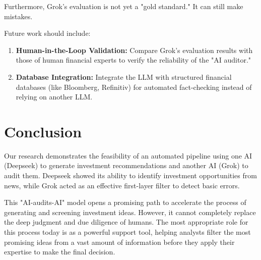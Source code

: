 \documentclass{article}
\begin{document}
Furthermore, Grok's evaluation is not yet a "gold standard." It can still make mistakes.

Future work should include:
\begin{enumerate}
    \item \textbf{Human-in-the-Loop Validation:} Compare Grok's evaluation results with those of human financial experts to verify the reliability of the "AI auditor."
    \item \textbf{Database Integration:} Integrate the LLM with structured financial databases (like Bloomberg, Refinitiv) for automated fact-checking instead of relying on another LLM.
\end{enumerate}

\section{Conclusion}

Our research demonstrates the feasibility of an automated pipeline using one AI (Deepseek) to generate investment recommendations and another AI (Grok) to audit them. Deepseek showed its ability to identify investment opportunities from news, while Grok acted as an effective first-layer filter to detect basic errors.

This "AI-audits-AI" model opens a promising path to accelerate the process of generating and screening investment ideas. However, it cannot completely replace the deep judgment and due diligence of humans. The most appropriate role for this process today is as a powerful support tool, helping analysts filter the most promising ideas from a vast amount of information before they apply their expertise to make the final decision.

\nocite{*}



\end{document}

